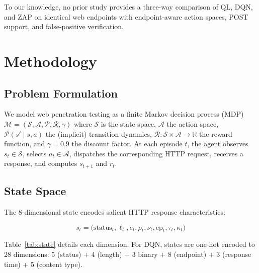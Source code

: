 \documentclass[5p,twocolumn]{elsarticle}
\begin{document}
To our knowledge, no prior study provides a three-way comparison of QL, DQN, and ZAP on identical web endpoints with endpoint-aware action spaces, POST support, and false-positive verification.

\section{Methodology}
\label{sec:methodology}

\subsection{Problem Formulation}

We model web penetration testing as a finite Markov decision process (MDP) $\mathcal{M} = (\mathcal{S}, \mathcal{A}, \mathcal{P}, \mathcal{R}, \gamma)$ where $\mathcal{S}$ is the state space, $\mathcal{A}$ the action space, $\mathcal{P}(s' \mid s,a)$ the (implicit) transition dynamics, $\mathcal{R}: \mathcal{S} \times \mathcal{A} \rightarrow \mathbb{R}$ the reward function, and $\gamma = 0.9$ the discount factor. At each episode $t$, the agent observes $s_t \in \mathcal{S}$, selects $a_t \in \mathcal{A}$, dispatches the corresponding HTTP request, receives a response, and computes $s_{t+1}$ and $r_t$.

\subsection{State Space}

The 8-dimensional state encodes salient HTTP response characteristics:

\begin{equation}
s_t = \bigl(\text{status}_t, \ell_t, e_t, \rho_t, \nu_t, \text{ep}_t, \tau_t, \kappa_t\bigr)
\end{equation}

Table~\ref{tab:state} details each dimension. For DQN, states are one-hot encoded to 28 dimensions: 5 (status) + 4 (length) + 3 binary + 8 (endpoint) + 3 (response time) + 5 (content type).
\end{document}
